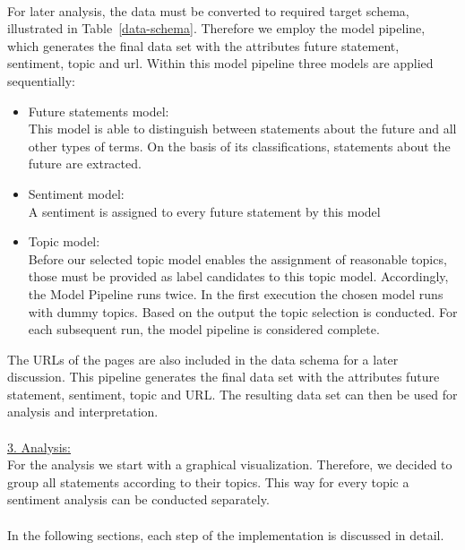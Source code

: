 \\
For later analysis, the data must be converted to required target schema, illustrated in Table~\ref{data-schema}. Therefore we employ the model pipeline, which generates the final data set with the attributes future statement, sentiment, topic and url. Within this model pipeline three models are applied sequentially:
\begin{itemize}
    \item Future statements model:\\
    This model is able to distinguish between statements about the future and all other types of terms.
On the basis of its classifications, statements about the future are extracted.
    \item Sentiment model:\\
A sentiment is assigned to every future statement by this model
    \item Topic model: \\
    Before our selected topic model enables the assignment of reasonable topics, those must be provided as label candidates to this topic model.
Accordingly, the Model Pipeline runs twice. In the first execution the chosen model runs with dummy topics. Based on the output the topic selection is conducted.
For each subsequent run, the model pipeline is considered complete.
\end{itemize}

The URLs of the pages are also included in the data schema for a later discussion. This pipeline generates the final data set with the attributes future statement, sentiment, topic and URL. The resulting data set can then be used for analysis and interpretation.
\\
\\
\underline{3. Analysis:}
\\
For the analysis we start with a graphical visualization.
Therefore, we decided to group all statements according to their topics.
This way for every topic a sentiment analysis can be conducted separately.
\\
\\
In the following sections, each step of the implementation is discussed in detail.


\begin{table}[t]
    \centering
\caption{\label{data-schema}
Data schema for visualization and analysis
}
\end{table}


